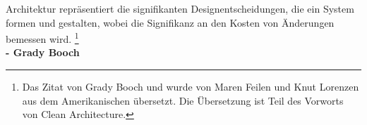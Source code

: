 
\thispagestyle{plain}
\begin{titlepage}

\begin{center}

\large{
    Architektur repräsentiert die signifikanten Designentscheidungen,
    die ein System formen und gestalten,
    wobei die Signifikanz an den Kosten von Änderungen bemessen wird.
    \footnote{Das Zitat von Grady Booch und wurde von Maren Feilen
    und Knut Lorenzen aus dem Amerikanischen übersetzt. Die Übersetzung ist Teil
    des Vorworts von Clean Architecture.\cite[S. 17]{RobertC.Martin2018}}
}\\[2ex]
\small{\textbf{- Grady Booch}}
\end{center}

\end{titlepage}

\restoregeometry
